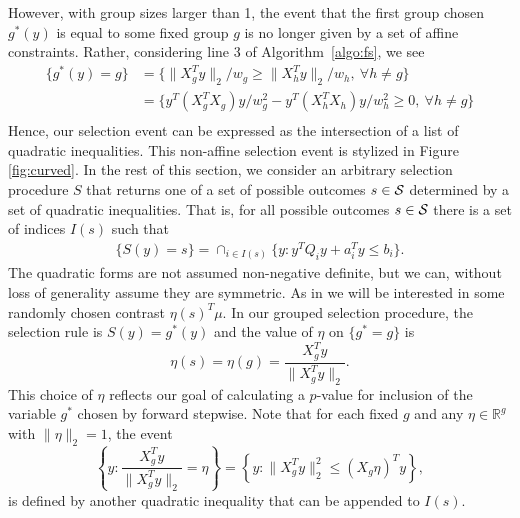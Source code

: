 \documentclass{imsart}
\newcommand{\real}{\mathbb{R}}
\begin{document}
However, with group sizes larger than 1, the event that the first group
chosen $g^*(y)$ is equal to some fixed group $g$ is no longer given by
a set of affine constraints. Rather, considering line 3 of
Algorithm~\ref{algo:fs}, we see
\begin{equation}
\label{eq:first:quadratic}
\begin{aligned}
\{g^*(y)=g\} &= \{ \|X_g^Ty\|_2 /w_g \geq \|X_h^Ty\|_2 /w_h , \ \forall h \neq g\} \\
&=  \{ y^T(X_g^TX_g)y / w_g^2 - y^T(X_h^TX_h)y / w_h^2 \geq 0, \ \forall h \neq g\} \\
\end{aligned}
\end{equation}
Hence, our selection event can be expressed as 
the intersection of a list of quadratic inequalities. This non-affine selection event is stylized in Figure
\ref{fig:curved}.
In the rest of this section, we consider an arbitrary selection procedure
$S$ that returns one of a set of possible outcomes $s \in {\cal S}$ determined by a set of quadratic inequalities.
That is, for all possible outcomes $s \in {\cal S}$ there is a set of indices
$I(s)$ such that
\begin{equation}
\label{eq:selection}
\begin{aligned}
\{S(y)=s\} = \cap_{i \in I(s)} \{y: y^TQ_iy + a_i^Ty\leq b_i \}.
\end{aligned}
\end{equation}
The quadratic forms are not assumed non-negative definite, but we can, without loss of generality
assume they are symmetric.
As in \cite{lasso:fixed} we will be interested in some randomly chosen contrast
$\eta(s)^T\mu$.
In our grouped selection procedure, the selection rule is $S(y)=g^*(y)$
and the value of $\eta$ on $\{ g^* = g \}$ is
$$
\eta(s) = \eta(g) = \frac{X_{g}^Ty}{\|X_{g}^Ty\|_2}.
$$
This choice of $\eta$ reflects our goal of calculating a $p$-value for inclusion of the variable $g^*$ chosen by forward stepwise.
Note that for each fixed $g$ and any $\eta \in \real^g$ with $\|\eta\|_2=1$, the event 
$$
\left\{y:\frac{X_g^Ty}{\|X_g^Ty\|_2} = \eta \right\} = \left\{y: \|X_g^Ty\|^2_2 \leq (X_g\eta)^Ty \right\},
$$
is defined by another quadratic inequality that can be appended to $I(s)$.
\end{document}
